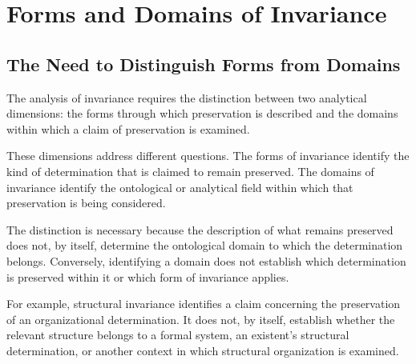 %
%
%
%
%

\section{Forms and Domains of Invariance}
\label{sec:forms-and-domains-of-invariance}

\subsection{The Need to Distinguish Forms from Domains}

The analysis of invariance requires the distinction between
two analytical dimensions: the forms through which preservation
is described and the domains within which a claim of preservation
is examined.

These dimensions address different questions. The forms of
invariance identify the kind of determination that is claimed
to remain preserved. The domains of invariance identify the
ontological or analytical field within which that preservation
is being considered.

The distinction is necessary because the description of what
remains preserved does not, by itself, determine the ontological
domain to which the determination belongs. Conversely, identifying
a domain does not establish which determination is preserved
within it or which form of invariance applies.

For example, structural invariance identifies a claim concerning
the preservation of an organizational determination. It does
not, by itself, establish whether the relevant structure belongs
to a formal system, an existent's structural determination,
or another context in which structural organization is examined.

